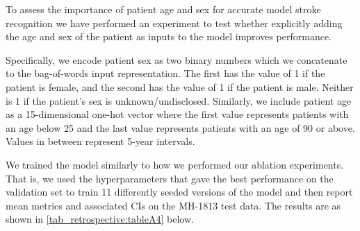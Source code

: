 {To assess the importance of patient age and sex for accurate model stroke recognition we have performed an experiment to test whether explicitly adding the age and sex of the patient as inputs to the model improves performance.

Specifically, we encode patient sex as two binary numbers which we concatenate to the bag-of-words input representation. The first has the value of 1 if the patient is female, and the second has the value of 1 if the patient is male. Neither is 1 if the patient's sex is unknown/undisclosed. Similarly, we include patient age as a 15-dimensional one-hot vector where the first value represents patients with an age below 25 and the last value represents patients with an age of 90 or above. Values in between represent 5-year intervals.

We trained the model similarly to how we performed our ablation experiments. That is, we used the hyperparameters that gave the best performance on the validation set to train 11 differently seeded versions of the model and then report mean metrics and associated CIs on the MH-1813 test data. The results are as shown in \cref{tab_retrospective:tableA4} below.

\begin{table}
    \centering
    \caption[Overall performance on MH-1813 test data for the model that also takes patient age and sex as direct inputs.]{Overall performance on MH-1813 test data for the model that also takes patient age and sex as direct inputs. We also list the original performance of call-takers and the model (w/o sex and age) from the main manuscript for ease of comparison [mean (95\% CI)]. NPV: negative predictive value, PPV: positive predictive value, FOR: false omission rate, CI: confidence interval.}
    \label{tab_retrospective:tableA4}
\end{table}}
